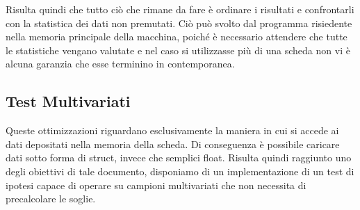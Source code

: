 Risulta quindi che tutto ciò che rimane da fare è ordinare i risultati e confrontarli con la statistica dei dati non premutati. Ciò può svolto dal programma risiedente nella memoria principale della macchina, poiché è necessario attendere che tutte le statistiche vengano valutate e nel caso si utilizzasse più di una scheda non vi è alcuna garanzia che esse terminino in contemporanea. 


\subsection{Test Multivariati}
Queste ottimizzazioni riguardano esclusivamente la maniera in cui si accede ai dati depositati nella memoria della scheda. Di conseguenza è possibile caricare dati sotto forma di struct, invece che semplici float. Risulta quindi raggiunto uno degli obiettivi di tale documento, disponiamo di un implementazione di un test di ipotesi capace di operare su campioni multivariati che non necessita di precalcolare le soglie.